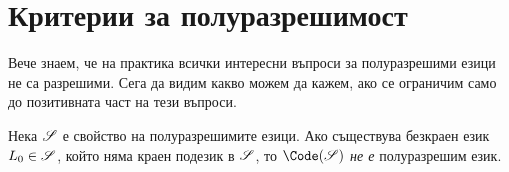 \section{Критерии за полуразрешимост}

Вече знаем, че на практика всички интересни въпроси за полуразрешими езици не са разрешими.
Сега да видим какво можем да кажем, ако се ограничим само до позитивната част на тези въпроси.

\begin{important}
  \begin{lemma}
    \label{lem:rice-shapiro:finite}
    Нека $\mathscr{S}$ е свойство на полуразрешимите езици.
    Ако съществува безкраен език $L_0 \in \mathscr{S}$, който няма краен подезик в $\mathscr{S}$,
    то $\Code(\Ss)$ {\em не е} полуразрешим език.  
  \end{lemma}
\end{important}
